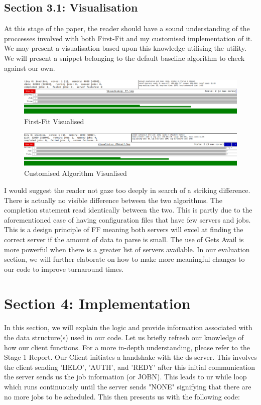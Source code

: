 \documentclass[a4paper]{article} %
\begin{document}
\subsection{Section 3.1: Visualisation}

At this stage of the paper, the reader should have a sound understanding of the proccesses involved with both First-Fit and my customised implementation of it. We may present a visualisation based upon this knowledge utilising the \textbf{} utility. We will present a snippet belonging to the default baseline algorithm to check against our own. 

\begin{figure}[h]
    \centering
    \includegraphics[width=1\textwidth]{images/ffds.png}
    \caption{First-Fit Visualised}
    \label{fig:my_label}
\end{figure}

\begin{figure}[h]
    \centering
    \includegraphics[width=1\textwidth]{images/ffcustom.png}
    \caption{Customised Algorithm Visualised}
    \label{fig:my_label}
\end{figure}

I would suggest the reader not gaze too deeply in search of a striking difference. There is actually no visible difference between the two algorithms. The completion statement read identically between the two. This is partly due to the aforementioned case of having configuration files that have few servers and jobs. This is a design principle of FF meaning both servers will excel at finding the correct server if the amount of data to parse is small. The use of Gets Avail is more powerful when there is a greater list of servers available. In our evaluation section, we will further elaborate on how to make more meaningful changes to our code to improve turnaround times.

\section{Section 4: Implementation}
In this section, we will explain the logic and provide information associated with the data structure(s) used in our code. Let us briefly refresh our knowledge of how our client functions. For a more in-depth understanding, please refer to the Stage 1 Report. Our Client initiates a handshake with the ds-server. This involves the client sending 'HELO', 'AUTH', and 'REDY' after this initial communication the server sends us the job information (or JOBN). This leads to ur while loop which runs continuously until the server sends "NONE" signifying that there are no more jobs to be scheduled. This then presents us with the following code:
\end{document}
